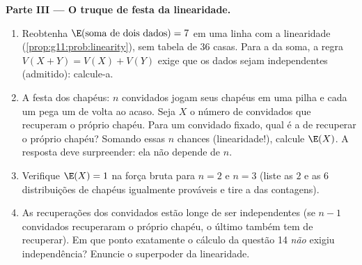 \begin{problem}
\medskip
\noindent\textbf{Parte III --- O truque de festa da
linearidade.}
\begin{enumerate}[resume]
  \item Reobtenha $\E(\text{soma de dois dados}) = 7$ em uma
        linha com a linearidade
        (\cref{prop:g11:prob:linearity}), sem tabela de $36$
        casas. Para a \emph{} da soma, a regra
        $V(X + Y) = V(X) + V(Y)$ exige que os dados sejam
        independentes (admitido): calcule-a.
  \item A festa dos chapéus: $n$ convidados jogam seus chapéus em
        uma pilha e cada um pega um de volta ao acaso. Seja $X$ o
        número de convidados que recuperam o próprio chapéu. Para
        um convidado fixado, qual é a  de recuperar
        o próprio chapéu? Somando essas $n$ chances
        (linearidade!), calcule $\E(X)$. A resposta deve
        surpreender: ela não depende de $n$.
  \item Verifique $\E(X) = 1$ na força bruta para $n = 2$ e
        $n = 3$ (liste as $2$ e as $6$ distribuições de chapéus
        igualmente prováveis e tire a  das contagens).
  \item As recuperações dos convidados estão longe de ser
        independentes (se $n - 1$ convidados recuperaram o
        próprio chapéu, o último também tem de recuperar). Em que
        ponto exatamente o cálculo da questão 14 \emph{não}
        exigiu independência? Enuncie o superpoder da
        linearidade.
\end{enumerate}


\end{problem}
